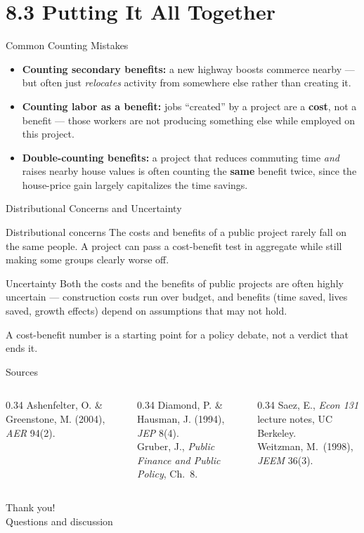 \documentclass[11pt,aspectratio=169]{beamer}
\begin{document}
\section{8.3 Putting It All Together}

\begin{frame}{Common Counting Mistakes}
  \small
  \begin{itemize}
    \item \textbf{Counting secondary benefits:} a new highway boosts commerce nearby --- but often just \emph{relocates} activity from somewhere else rather than creating it.
    \item \textbf{Counting labor as a benefit:} jobs ``created'' by a project are a \textbf{cost}, not a benefit --- those workers are not producing something else while employed on this project.
    \item \textbf{Double-counting benefits:} a project that reduces commuting time \emph{and} raises nearby house values is often counting the \textbf{same} benefit twice, since the house-price gain largely capitalizes the time savings.
  \end{itemize}
\end{frame}

\begin{frame}{Distributional Concerns and Uncertainty}
  \begin{block}{Distributional concerns}
    The costs and benefits of a public project rarely fall on the same people. A project can pass a cost-benefit test in aggregate while still making some groups clearly worse off.
  \end{block}
  \begin{block}{Uncertainty}
    Both the costs and the benefits of public projects are often highly uncertain --- construction costs run over budget, and benefits (time saved, lives saved, growth effects) depend on assumptions that may not hold.
  \end{block}
  \vspace{0.4em}
  \small A cost-benefit number is a starting point for a policy debate, not a verdict that ends it.
\end{frame}

\begin{frame}{Sources}
  \tiny
  \begin{columns}[T]
    \begin{column}{0.34\textwidth}
      Ashenfelter, O. \& Greenstone, M. (2004), \emph{AER} 94(2).
    \end{column}
    \begin{column}{0.34\textwidth}
      Diamond, P. \& Hausman, J. (1994), \emph{JEP} 8(4).\\
      Gruber, J., \emph{Public Finance and Public Policy}, Ch.\ 8.
    \end{column}
    \begin{column}{0.34\textwidth}
      Saez, E., \emph{Econ 131} lecture notes, UC Berkeley.\\
      Weitzman, M.\ (1998), \emph{JEEM} 36(3).
    \end{column}
  \end{columns}
\end{frame}

\begin{frame}[standout]
  Thank you!\\
  \vspace{0.5em}
  \small Questions and discussion
\end{frame}
\end{document}
